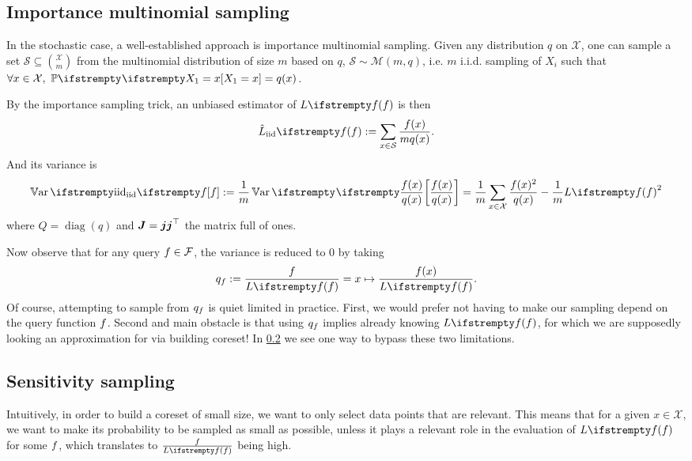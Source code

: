 \subsection{Importance multinomial sampling}

In the stochastic case, a well-established approach is importance multinomial sampling. Given any distribution $q$ on $\mathcal{X}$, one can sample a set $\mathcal{S} \subseteq \binom{\mathcal{X}}{m}$ from the multinomial distribution of size $m$ based on $q$, $\mathcal S \sim \mathcal M(m, q)$, i.e. $m$ i.i.d. sampling of $X_i$ such that $\forall x \in \mathcal{X},\ \PP{}{X_1=x} = q(x)$.

By the importance sampling trick, an unbiased estimator of $\loss{\query}$ is then
\begin{equation*}
	\estloss{\textrm{iid}}{\query} := \sum_{x\in \mathcal S} \frac{\query(x)}{m q(x)}.
\end{equation*}
And its variance is
\begin{equation*}
	\Var{\textrm{iid}}{\query} :=\frac{1}{m} \Var{}{\frac {\query(x)} {q(x)}}
	=\frac{1}{m} \sum_{x \in \mathcal{X}} \frac{\query(x)^{2}}{q(x)} -\frac{1}{m} \loss{\query}^{2}
\end{equation*}
where $Q = \operatorname{diag}(q)$ and $\boldsymbol{J} = \boldsymbol{j} \boldsymbol{j} ^\top$ the matrix full of ones. 


Now observe that for any query $f \in \mathcal{F}$, the variance is reduced to 0 by taking
\begin{equation*}
    q_{\query} :=\frac{ \query}{\loss{\query}} = x \mapsto \frac{ \query(x)}{\loss{\query}}.
\end{equation*}
Of course, attempting to sample from $q_f$ is quiet limited in practice. First, we would prefer not having to make our sampling depend on the query function $f$. Second and main obstacle is that using $q_f$ implies already knowing $\loss{\query}$, for which we are supposedly looking an approximation for via building coreset! In \cref{sect_senstsampl} we see one way to bypass these two limitations.

\subsection{Sensitivity sampling}
\label{sect_senstsampl}



Intuitively, in order to build a coreset of small size, we want to only select data points that are relevant. This means that for a given $x \in \mathcal{X}$, we want to make its probability to be sampled as small as possible, unless it plays a relevant role in the evaluation of $\loss{\query}$ for some $f$, which translates to $\frac{\query}{\loss{\query}}$ being high.

